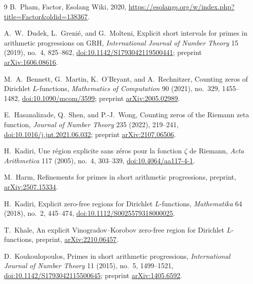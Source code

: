 \documentclass[11pt]{article}
\theoremstyle{remark}
\begin{document}
\begin{thebibliography}{9}
\small
{}
B.~Pham,
\newblock Factor,
\newblock Esolang Wiki, 2020,
\newblock \url{https://esolangs.org/w/index.php?title=Factor&oldid=138367}.

A.~W.~Dudek, L.~Greni\'e, and G.~Molteni,
\newblock Explicit short intervals for primes in arithmetic progressions on
GRH,
\newblock \emph{International Journal of Number Theory} 15 (2019), no.~4,
825--862,
\newblock \href{https://doi.org/10.1142/S1793042119500441}
{doi:10.1142/S1793042119500441}; preprint
\href{https://arxiv.org/abs/1606.08616}{arXiv:1606.08616}.

M.~A.~Bennett, G.~Martin, K.~O'Bryant, and A.~Rechnitzer,
\newblock Counting zeros of Dirichlet $L$-functions,
\newblock \emph{Mathematics of Computation} 90 (2021), no.~329, 1455--1482,
\newblock \href{https://doi.org/10.1090/mcom/3599}{doi:10.1090/mcom/3599};
preprint \href{https://arxiv.org/abs/2005.02989}{arXiv:2005.02989}.

E.~Hasanalizade, Q.~Shen, and P.-J.~Wong,
\newblock Counting zeros of the Riemann zeta function,
\newblock \emph{Journal of Number Theory} 235 (2022), 219--241,
\newblock \href{https://doi.org/10.1016/j.jnt.2021.06.032}
{doi:10.1016/j.jnt.2021.06.032}; preprint
\href{https://arxiv.org/abs/2107.06506}{arXiv:2107.06506}.

H.~Kadiri,
\newblock Une r\'egion explicite sans z\'eros pour la fonction $\zeta$ de
Riemann,
\newblock \emph{Acta Arithmetica} 117 (2005), no.~4, 303--339,
\newblock \href{https://doi.org/10.4064/aa117-4-1}{doi:10.4064/aa117-4-1}.

M.~Harm,
\newblock Refinements for primes in short arithmetic progressions,
\newblock preprint,
\newblock \href{https://arxiv.org/abs/2507.15334}{arXiv:2507.15334}.

H.~Kadiri,
\newblock Explicit zero-free regions for Dirichlet $L$-functions,
\newblock \emph{Mathematika} 64 (2018), no.~2, 445--474,
\newblock \href{https://doi.org/10.1112/S0025579318000025}
{doi:10.1112/S0025579318000025}.

T.~Khale,
\newblock An explicit Vinogradov--Korobov zero-free region for Dirichlet
$L$-functions,
\newblock preprint,
\newblock \href{https://arxiv.org/abs/2210.06457}{arXiv:2210.06457}.

D.~Koukoulopoulos,
\newblock Primes in short arithmetic progressions,
\newblock \emph{International Journal of Number Theory} 11 (2015), no.~5,
1499--1521,
\newblock \href{https://doi.org/10.1142/S1793042115500645}
{doi:10.1142/S1793042115500645}; preprint
\href{https://arxiv.org/abs/1405.6592}{arXiv:1405.6592}.


\end{thebibliography}
\end{document}
